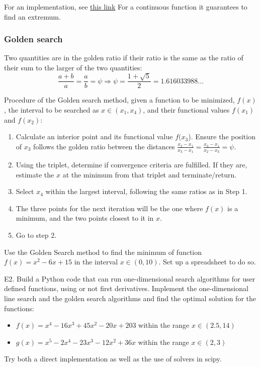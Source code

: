  For an implementation, see \href{https://machinelearningmastery.com/line-search-optimization-with-python/}{this link}
For a continuous function it guarantees to find an extremum.

\subsubsection{Golden search}
   Two quantities are in the golden ratio if their ratio is the same as the ratio of their sum to the larger of the two quantities:
\[
\frac{a+b}{a}=\frac{a}{b}=\psi \Rightarrow \psi=\frac{1+\sqrt{5}}{2}=1.616033988...
\]


Procedure of the Golden search method, given a function  to be minimized, $f(x)$, the interval to be searched as $x\in(x_1,x_4)$, and their functional values $f(x_1)$ and $f(x_2)$:
\begin{enumerate}
  \item Calculate an interior point and its functional value $f(x_3$). Ensure the position of $x_3$ follows the golden ratio between the distances $\frac{x_2-x_1}{x_3-x_1}=\frac{x_3-x_1}{x_2-x_3}=\psi$.
  \item Using the triplet, determine if convergence criteria are fulfilled. If they are, estimate the $x$ at the minimum from that triplet and terminate/return.
  \item Select $x_4$ within the largest interval, following the same ratios as in Step 1.
  \item The three points for the next iteration will be the one where $f(x)$ is a minimum, and the two points closest to it in $x$.
  \item Go to step 2.
\end{enumerate}

\begin{Exercise}
  Use the Golden Search method to find the minimum of function $f(x)=x^2-6x+15$ in the interval $x\in(0,10)$. Set up a spreadsheet to do so.
\end{Exercise}


\begin{program}
  E2. Build a Python code that can run one-dimensional search algorithms for user defined functions, using or not first derivatives. Implement the one-dimensional line search and the golden search algorithms and find the optimal solution for the functions:
  \begin{itemize}
    \item $f(x)=x^4-16x^3+45 x^2-20x+203$ within the range $x\in(2.5,14)$
    \item $g(x)=x^5-2x^4-23x^3-12x^2+36x$ within the range $x\in(2,3)$
  \end{itemize}
  Try both a direct implementation as well as the use of solvers in scipy.
\end{program}

